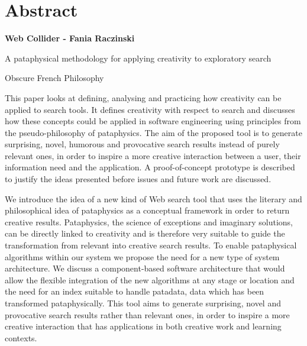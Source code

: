 
\pagestyle{empty}

\chapter{Abstract}
\label{abstract}

{\Large \textbf{Web Collider - Fania Raczinski}}

\vspace{0.5cm}

A pataphysical methodology for applying creativity to exploratory search

\vspace{1cm}

Obscure French Philosophy

This paper looks at defining, analysing and practicing how creativity can be applied to search tools. It defines creativity with respect to search and discusses how these concepts could be applied in software engineering using principles from the pseudo-philosophy of pataphysics. The aim of the proposed tool is to generate surprising, novel, humorous and provocative search results instead of purely relevant ones, in order to inspire a more creative interaction between a user, their information need and the application. A proof-of-concept prototype is described to justify the ideas presented before issues and future work are discussed.

We introduce the idea of a new kind of Web search tool that uses the literary and philosophical idea of pataphysics as a conceptual framework in order to return creative results. Pataphysics, the science of exceptions and imaginary solutions, can be directly linked to creativity and is therefore very suitable to guide the transformation from relevant into creative search results. To enable pataphysical algorithms within our system we propose the need for a new type of system architecture. We discuss a component-based software architecture that would allow the flexible integration of the new algorithms at any stage or location and the need for an index suitable to handle patadata, data which has been transformed pataphysically. This tool aims to generate surprising, novel and provocative search results rather than relevant ones, in order to inspire a more creative interaction that has applications in both creative work and learning contexts.

\clearpage

